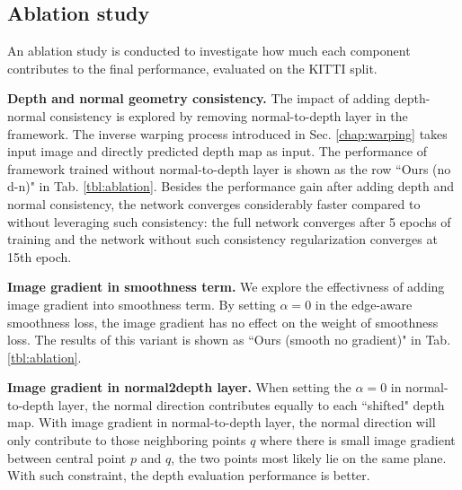 





\subsection{Ablation study}

An ablation study is conducted to investigate how much each component contributes to the final performance, evaluated on the KITTI split.

\textbf{Depth and normal geometry consistency.} The impact of adding depth-normal consistency is explored by removing normal-to-depth layer in the framework. The inverse warping process introduced in Sec. \ref{chap:warping} takes input image and directly predicted depth map as input. The performance of framework trained without normal-to-depth layer is shown as the row ``Ours (no d-n)" in Tab. \ref{tbl:ablation}. Besides the performance gain after adding depth and normal consistency, the network converges considerably faster compared to without leveraging such consistency: the full network converges after 5 epochs of training and the network without such consistency regularization converges at 15th epoch.

\textbf{Image gradient in smoothness term.} We explore the effectivness of adding image gradient into smoothness term. By setting $\alpha=0$ in the edge-aware smoothness loss, the image gradient has no effect on the weight of smoothness loss. The results of this variant is shown as ``Ours (smooth no gradient)" in Tab. \ref{tbl:ablation}.

\textbf{Image gradient in normal2depth layer.} When setting the $\alpha =0$ in normal-to-depth layer, the normal direction contributes equally to each ``shifted" depth map. With image gradient in normal-to-depth layer, the normal direction will only contribute to those neighboring points $q$ where there is small image gradient between central point $p$ and $q$, \ie the two points most likely lie on the same plane. With such constraint, the depth evaluation performance is better. 

